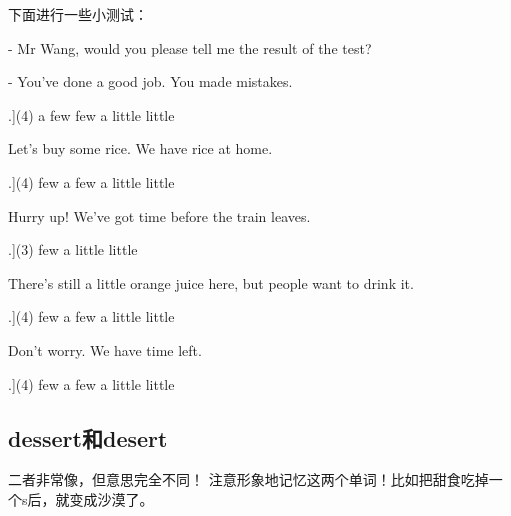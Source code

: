 \documentclass[a4paper]{article}
\begin{document}
下面进行一些小测试：

\begin{question}
 - Mr Wang, would you please tell me the result of the test?

 - You've done a good job. You made \blank[width=1cm]{} mistakes.

 \begin{tasks}[counter-format=tsk[A].](4)
     \task a few
     \task few
     \task a little
     \task little
    \end{tasks}
\end{question}


\begin{question} 
 Let's buy some rice. We have \blank[width=1cm]{} rice at home.

 \begin{tasks}[counter-format=tsk[A].](4)
     \task few
     \task a few
     \task a little
     \task little
    \end{tasks}
\end{question}

\begin{question}
 Hurry up! We've got \blank[width=1cm]{} time before the train leaves.

 \begin{tasks}[counter-format=tsk[A].](3)
     \task few
     \task a little
     \task little
    \end{tasks}
\end{question}

\begin{question}
 There's still a little orange juice here, but \blank[width=1cm]{} people want to drink it.

  \begin{tasks}[counter-format=tsk[A].](4)
     \task few
     \task a few
     \task a little
     \task little
    \end{tasks}
\end{question}

 \begin{question}
 Don't worry. We have \blank[width=1cm]{} time left.

  \begin{tasks}[counter-format=tsk[A].](4)
     \task few
     \task a few
     \task a little
     \task little
    \end{tasks}
\end{question}

  \subsection{dessert和desert}
二者非常像，但意思完全不同！ 注意形象地记忆这两个单词！比如把甜食吃掉一个s后，就变成沙漠了。
\end{document}
